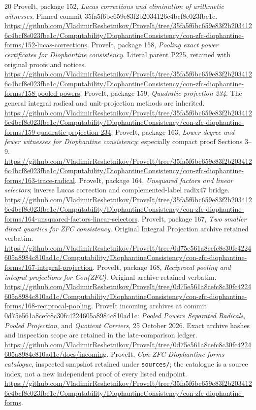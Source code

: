\documentclass[11pt]{article}
\begin{document}
\begin{thebibliography}{20}
 ProveIt, package 152, \emph{Lucas corrections and elimination
of arithmetic witnesses}. Pinned commit 35fa5f6bc659e83f2b2034126c4bcf8e023fbe1c.
\url{https://github.com/VladimirReshetnikov/ProveIt/tree/35fa5f6bc659e83f2b2034126c4bcf8e023fbe1c/Computability/DiophantineConsistency/con-zfc-diophantine-forms/152-lucas-corrections}.
 ProveIt, package 158, \emph{Pooling exact power certificates
for Diophantine consistency}. Literal parent P225, retained with original
proofs and notices. \url{https://github.com/VladimirReshetnikov/ProveIt/tree/35fa5f6bc659e83f2b2034126c4bcf8e023fbe1c/Computability/DiophantineConsistency/con-zfc-diophantine-forms/158-pooled-powers}.
 ProveIt, package 159, \emph{Quadratic projection 234}.
The general integral radical and unit-projection methods are inherited.
\url{https://github.com/VladimirReshetnikov/ProveIt/tree/35fa5f6bc659e83f2b2034126c4bcf8e023fbe1c/Computability/DiophantineConsistency/con-zfc-diophantine-forms/159-quadratic-projection-234}.
 ProveIt, package 163, \emph{Lower degree and fewer witnesses
for Diophantine consistency}; especially compact proof Sections 3--9.
\url{https://github.com/VladimirReshetnikov/ProveIt/tree/35fa5f6bc659e83f2b2034126c4bcf8e023fbe1c/Computability/DiophantineConsistency/con-zfc-diophantine-forms/163-trace-radical}.
 ProveIt, package 164, \emph{Unsquared factors and linear
selectors}; inverse Lucas correction and complemented-label radix47 bridge.
\url{https://github.com/VladimirReshetnikov/ProveIt/tree/35fa5f6bc659e83f2b2034126c4bcf8e023fbe1c/Computability/DiophantineConsistency/con-zfc-diophantine-forms/164-unsquared-factors-linear-selectors}.
 ProveIt, package 167, \emph{Two smaller direct quartics for
ZFC consistency}. Original Integral Projection archive retained verbatim.
\url{https://github.com/VladimirReshetnikov/ProveIt/tree/0d75e561a8cefc8c30fc4224605a8984c810ad1c/Computability/DiophantineConsistency/con-zfc-diophantine-forms/167-integral-projection}.
 ProveIt, package 168, \emph{Reciprocal pooling and integral
projections for Con(ZFC)}. Original archive retained verbatim.
\url{https://github.com/VladimirReshetnikov/ProveIt/tree/0d75e561a8cefc8c30fc4224605a8984c810ad1c/Computability/DiophantineConsistency/con-zfc-diophantine-forms/168-reciprocal-pooling}.
 ProveIt incoming archives at commit
0d75e561a8cefc8c30fc4224605a8984c810ad1c:
\emph{Pooled Powers Separated Radicals}, \emph{Pooled Projection},
and \emph{Quotient Carriers}, 25 October 2026. Exact archive hashes and
inspection scope are retained in the late-comparison ledger.
\url{https://github.com/VladimirReshetnikov/ProveIt/tree/0d75e561a8cefc8c30fc4224605a8984c810ad1c/docs/incoming}.
 ProveIt, \emph{Con-ZFC Diophantine forms catalogue},
inspected snapshot retained under \texttt{sources/}; the catalogue is a
source index, not a new independent proof of every listed endpoint.
\url{https://github.com/VladimirReshetnikov/ProveIt/tree/35fa5f6bc659e83f2b2034126c4bcf8e023fbe1c/Computability/DiophantineConsistency/con-zfc-diophantine-forms}.
\end{thebibliography}
\end{document}
